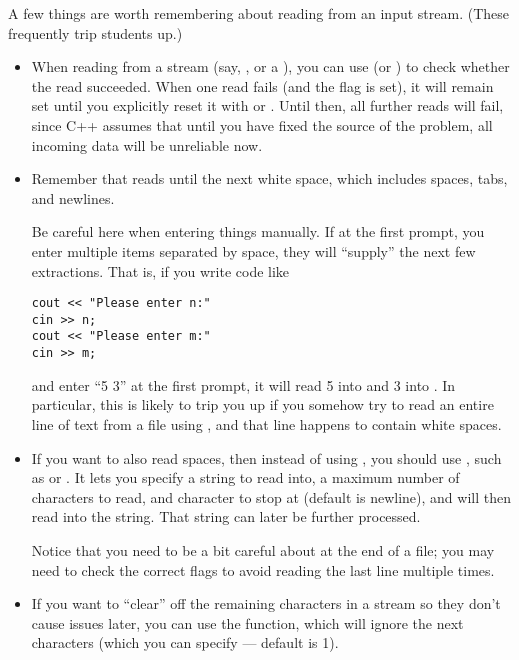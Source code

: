 A few things are worth remembering about reading from an input
stream. (These frequently trip students up.)
\begin{itemize}
\item When reading from a stream (say, , or a ), you can use  (or )
  to check whether the read succeeded.
  When one read fails (and the  flag is set), it will
  remain set until you explicitly reset it with  or
  . Until then, all further reads will fail,
  since C++ assumes that until you have fixed the source of the problem,
  all incoming data will be unreliable now.

\item Remember that \code{>>} reads until the next white space, which
  includes spaces, tabs, and newlines.

  Be careful here when entering things manually. If at the first
  prompt, you enter multiple items separated by space, they will
  ``supply'' the next few extractions. That is, if you write code like
\begin{verbatim}
cout << "Please enter n:"
cin >> n;
cout << "Please enter m:"
cin >> m;
\end{verbatim}
  and enter ``5 3'' at the first prompt, it will read 5 into 
  and 3 into .
  In particular, this is likely to trip you up if you somehow try to
  read an entire line of text from a file using \code{>>}, and that
  line happens to contain white spaces.

\item If you want to also read spaces, then instead of using
  \code{>>}, you should use , such as
   or . 
  It lets you specify a string to read into, 
  a maximum number of characters to read, and 
  character to stop at (default is newline), and will then read into
  the string. That string can later be further processed.

  Notice that you need to be a bit careful about  at the
  end of a file; you may need to check the correct flags to avoid reading the
  last line multiple times.

\item If you want to ``clear'' off the remaining characters in a
  stream so they don't cause issues later, you can use the
   function, which will ignore the next 
  characters (which you can specify --- default is 1).
\end{itemize}

